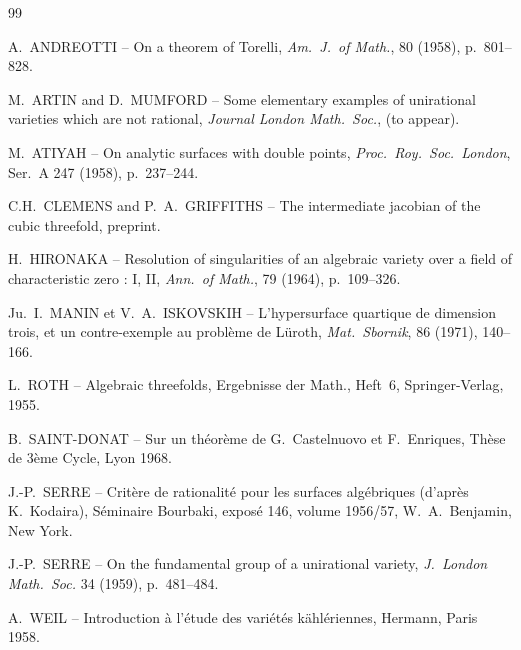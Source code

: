 \documentclass[12pt]{amsart}
\theoremstyle{plain}
\theoremstyle{definition}
\theoremstyle{remark}
\begin{document}
\begin{thebibliography}{99}

 A.\ ANDREOTTI -- On a theorem of Torelli, \textit{Am.\ J.\ of Math.}, 80 (1958), p.~801--828.

 M.\ ARTIN and D.\ MUMFORD -- Some elementary examples of unirational varieties which are not rational, \textit{Journal London Math.\ Soc.}, (to appear).

 M.\ ATIYAH -- On analytic surfaces with double points, \textit{Proc.\ Roy.\ Soc.\ London}, Ser.\ A 247 (1958), p.~237--244.

 C.H.\ CLEMENS and P.\ A.\ GRIFFITHS -- The intermediate jacobian of the cubic threefold, preprint.

 H.\ HIRONAKA -- Resolution of singularities of an algebraic variety over a field of characteristic zero : I, II, \textit{Ann.\ of Math.}, 79 (1964), p.~109--326.

 Ju.\ I.\ MANIN et V.\ A.\ ISKOVSKIH -- L'hypersurface quartique de dimension trois, et un contre-exemple au probl\`eme de L\"uroth, \textit{Mat.\ Sbornik}, 86 (1971), 140--166.

 L.\ ROTH -- Algebraic threefolds, Ergebnisse der Math., Heft~6, Springer-Verlag, 1955.

 B.\ SAINT-DONAT -- Sur un th\'eor\`eme de G.\ Castelnuovo et F.\ Enriques, Th\`ese de 3\`eme Cycle, Lyon 1968.

 J.-P.\ SERRE -- Crit\`ere de rationalit\'e pour les surfaces alg\'ebriques (d'apr\`es K.\ Kodaira), S\'eminaire Bourbaki, expos\'e 146, volume 1956/57, W.\ A.\ Benjamin, New York.

 J.-P.\ SERRE -- On the fundamental group of a unirational variety, \textit{J.\ London Math.\ Soc.} 34 (1959), p.~481--484.

 A.\ WEIL -- Introduction \`a l'\'etude des vari\'et\'es k\"ahl\'eriennes, Hermann, Paris 1958.

\end{thebibliography}
\end{document}
